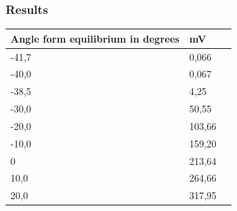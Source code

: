 \subsubsection{Results}
\begin{table}[H]
	\begin{tabular}{|l|l|p{4.3cm}|}
		\hline%
		\textbf{Angle form equilibrium in degrees}       &  \textbf{mV}         \\
		\hline%
		-41,7                                         & 0,066               \\
		\hline%
		-40,0 										  & 0,067               \\
		\hline%
		-38,5                              			  & 4,25               \\
		\hline%
		-30,0                              			  & 50,55               \\
		\hline%
		-20,0                                         & 103,66               \\
		\hline%
		-10,0 										  & 159,20               \\
		\hline%
		0                               			  & 213,64               \\
		\hline%
		10,0                                          & 264,66               \\
		\hline%
		20,0 										  & 317,95               \\
		\hline%

\end{tabular}
\end{table}
